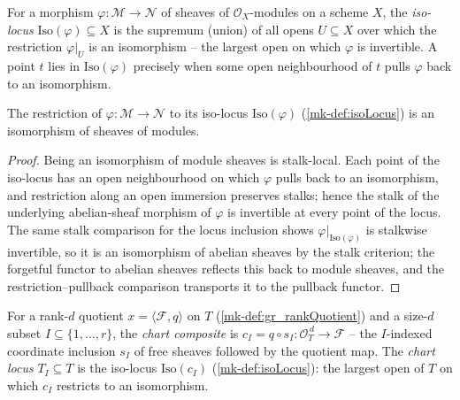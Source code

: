 \begin{definition}\label{mk-def:isoLocus}
  \leanok

  For a morphism \(\varphi : \mathcal{M} \to \mathcal{N}\) of sheaves of
  \(\mathcal{O}_X\)-modules on a scheme \(X\), the \emph{iso-locus}
  \(\mathrm{Iso}(\varphi) \subseteq X\) is the supremum (union) of all opens
  \(U \subseteq X\) over which the restriction \(\varphi|_U\) is an isomorphism -- the largest
  open on which \(\varphi\) is invertible. A point \(t\) lies in \(\mathrm{Iso}(\varphi)\)
  precisely when some open neighbourhood of \(t\) pulls \(\varphi\) back to an isomorphism.
\end{definition}

\begin{lemma}\label{mk-lem:isIso_pullback_isoLocus_map}
  \leanok

  The restriction of \(\varphi : \mathcal{M} \to \mathcal{N}\) to its iso-locus
  \(\mathrm{Iso}(\varphi)\) (\ref{mk-def:isoLocus}) is an isomorphism of sheaves of modules.
\end{lemma}
\begin{proof}
  Being an isomorphism of module sheaves is stalk-local. Each point of the iso-locus has an
  open neighbourhood on which \(\varphi\) pulls back to an isomorphism, and restriction along
  an open immersion preserves stalks; hence the stalk of the underlying abelian-sheaf morphism
  of \(\varphi\) is invertible at every point of the locus. The same stalk comparison for the
  locus inclusion shows \(\varphi|_{\mathrm{Iso}(\varphi)}\) is stalkwise invertible, so it is
  an isomorphism of abelian sheaves by the stalk criterion; the forgetful functor to abelian
  sheaves reflects this back to module sheaves, and the restriction--pullback comparison
  transports it to the pullback functor.
\end{proof}

\begin{definition}\label{mk-def:chartLocus}
  \leanok

  For a rank-\(d\) quotient \(x = \langle \mathcal{F}, q\rangle\) on \(T\)
  (\ref{mk-def:gr_rankQuotient}) and a size-\(d\) subset \(I \subseteq \{1,\dots,r\}\), the
  \emph{chart composite} is \(c_I = q \circ s_I : \mathcal{O}_T^{\,d} \to \mathcal{F}\) -- the
  \(I\)-indexed coordinate inclusion \(s_I\) of free sheaves followed by the quotient map. The
  \emph{chart locus} \(T_I \subseteq T\) is the iso-locus \(\mathrm{Iso}(c_I)\)
  (\ref{mk-def:isoLocus}): the largest open of \(T\) on which \(c_I\) restricts to an
  isomorphism.
\end{definition}

